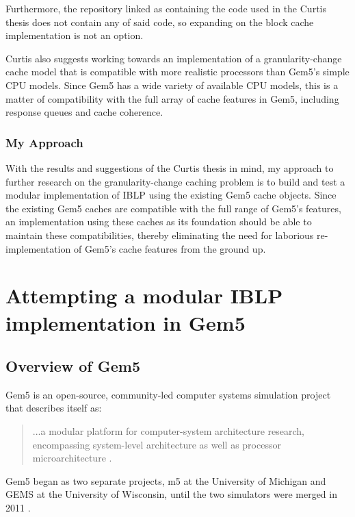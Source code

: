 \documentclass[12pt,twoside]{reedthesis}
\begin{document}
	Furthermore, the repository linked as containing the code used in the Curtis thesis does not contain any of said code, so expanding on the block cache implementation is not an option.

	Curtis also suggests working towards an implementation of a granularity-change cache model that is compatible with more realistic processors than Gem5's simple CPU models. Since Gem5 has a wide variety of available CPU models, this is a matter of compatibility with the full array of cache features in Gem5, including response queues and cache coherence.

	\subsection*{My Approach}

	With the results and suggestions of the Curtis thesis in mind, my approach to further research on the granularity-change caching problem is to build and test a modular implementation of IBLP using the existing Gem5 cache objects. Since the existing Gem5 caches are compatible with the full range of Gem5's features, an implementation using these caches as its foundation should be able to maintain these compatibilities, thereby eliminating the need for laborious re-implementation of Gem5's cache features from the ground up.


\chapter{Attempting a modular IBLP implementation in Gem5}

\section{Overview of Gem5}

Gem5 is an open-source, community-led computer systems simulation project that describes itself as: \begin{quote}
	...a modular platform for computer-system architecture research, encompassing system-level architecture as well as processor microarchitecture \cite{gem5-about}.
\end{quote}

Gem5 began as two separate projects, m5 at the University of Michigan and GEMS at the University of Wisconsin, until the two simulators were merged in 2011 \cite{gem5-about}.
\end{document}
